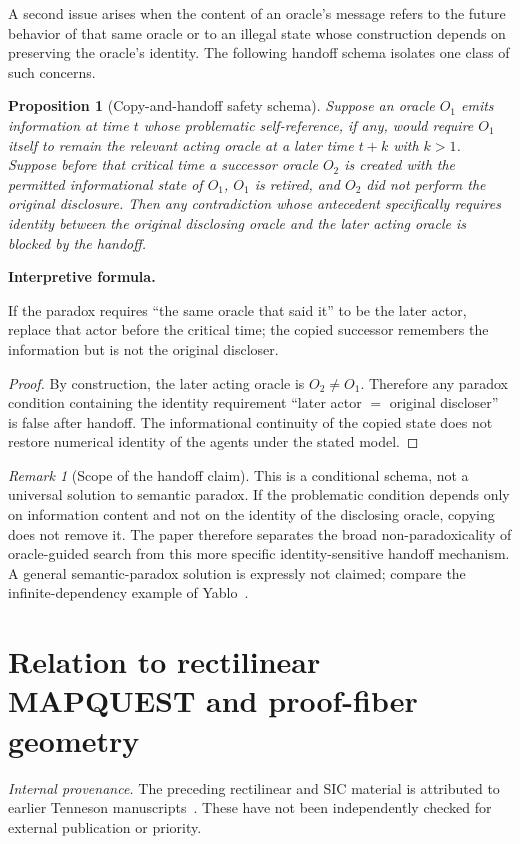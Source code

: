 \documentclass[11pt]{article}
\newtheorem{proposition}[theorem]{Proposition}
\theoremstyle{definition}
\theoremstyle{remark}
\newtheorem{remark}[theorem]{Remark}
\newenvironment{interpretiveformula}{%
  \begin{center}\begin{minipage}{0.92\linewidth}\small
  \textbf{Interpretive formula.}\ \raggedright}{\end{minipage}\end{center}}
\begin{document}
A second issue arises when the content of an oracle's message refers to the future behavior of that same oracle or to an illegal state whose construction depends on preserving the oracle's identity. The following handoff schema isolates one class of such concerns.

\begin{proposition}[Copy-and-handoff safety schema]
Suppose an oracle $O_1$ emits information at time $t$ whose problematic self-reference, if any, would require $O_1$ itself to remain the relevant acting oracle at a later time $t+k$ with $k>1$. Suppose before that critical time a successor oracle $O_2$ is created with the permitted informational state of $O_1$, $O_1$ is retired, and $O_2$ did not perform the original disclosure. Then any contradiction whose antecedent specifically requires identity between the original disclosing oracle and the later acting oracle is blocked by the handoff.
\end{proposition}
\begin{interpretiveformula}
If the paradox requires ``the same oracle that said it'' to be the later actor, replace that actor before the critical time; the copied successor remembers the information but is not the original discloser.
\end{interpretiveformula}
\begin{proof}
By construction, the later acting oracle is $O_2\neq O_1$. Therefore any paradox condition containing the identity requirement ``later actor $=$ original discloser'' is false after handoff. The informational continuity of the copied state does not restore numerical identity of the agents under the stated model.
\end{proof}
\begin{remark}[Scope of the handoff claim]
This is a conditional schema, not a universal solution to semantic paradox. If the problematic condition depends only on information content and not on the identity of the disclosing oracle, copying does not remove it. The paper therefore separates the broad non-paradoxicality of oracle-guided search from this more specific identity-sensitive handoff mechanism. A general semantic-paradox solution is expressly not claimed; compare the infinite-dependency example of Yablo~\cite{yablo}.
\end{remark}

\section{Relation to rectilinear MAPQUEST and proof-fiber geometry}
\noindent\textit{Internal provenance.} The preceding rectilinear and SIC material is attributed to earlier Tenneson manuscripts~\cite{recttarget,proofsA,sicfiber,amldcart}. These have not been independently checked for external publication or priority.
\end{document}
